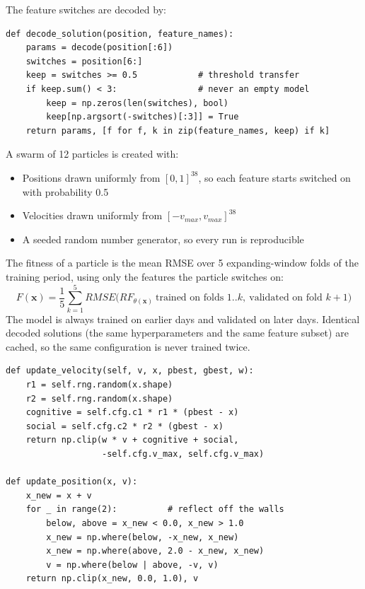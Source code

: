 The feature switches are decoded by:
\begin{verbatim}
def decode_solution(position, feature_names):
    params = decode(position[:6])
    switches = position[6:]
    keep = switches >= 0.5            # threshold transfer
    if keep.sum() < 3:                # never an empty model
        keep = np.zeros(len(switches), bool)
        keep[np.argsort(-switches)[:3]] = True
    return params, [f for f, k in zip(feature_names, keep) if k]
\end{verbatim}

A swarm of 12 particles is created with:
\begin{itemize}
\item Positions drawn uniformly from $[0,1]^{38}$, so each feature starts switched on with probability 0.5
\item Velocities drawn uniformly from $[-v_{max}, v_{max}]^{38}$
\item A seeded random number generator, so every run is reproducible
\end{itemize}

The fitness of a particle is the mean RMSE over 5 expanding-window folds of the training period, using only the features the particle switches on:
\begin{equation}
F(\mathbf{x}) = \frac{1}{5}\sum_{k=1}^{5} RMSE\big(RF_{\theta(\mathbf{x})}\ \text{trained on folds } 1..k,\ \text{validated on fold } k+1\big)
\end{equation}
The model is always trained on earlier days and validated on later days. Identical decoded solutions (the same hyperparameters and the same feature subset) are cached, so the same configuration is never trained twice.

\begin{verbatim}
def update_velocity(self, v, x, pbest, gbest, w):
    r1 = self.rng.random(x.shape)
    r2 = self.rng.random(x.shape)
    cognitive = self.cfg.c1 * r1 * (pbest - x)
    social = self.cfg.c2 * r2 * (gbest - x)
    return np.clip(w * v + cognitive + social,
                   -self.cfg.v_max, self.cfg.v_max)

def update_position(x, v):
    x_new = x + v
    for _ in range(2):          # reflect off the walls
        below, above = x_new < 0.0, x_new > 1.0
        x_new = np.where(below, -x_new, x_new)
        x_new = np.where(above, 2.0 - x_new, x_new)
        v = np.where(below | above, -v, v)
    return np.clip(x_new, 0.0, 1.0), v
\end{verbatim}

